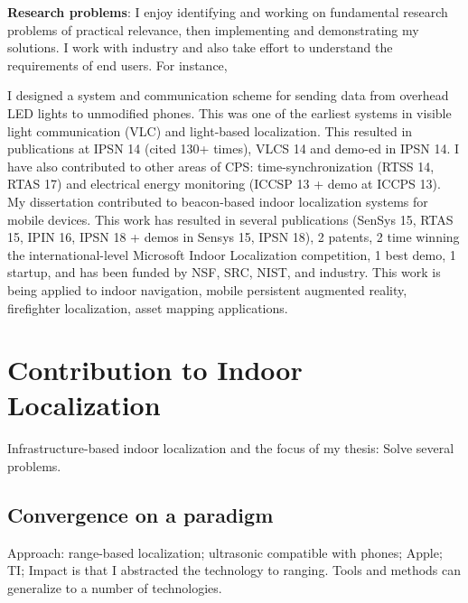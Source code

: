 \documentclass[10pt]{article}
\begin{document}
 \newpage

\textbf{Research problems}:
I enjoy identifying and working on fundamental research problems of practical relevance, then implementing and demonstrating my solutions. I work with industry and also take effort to understand the requirements of end users. For instance, 

I designed a system and communication scheme for sending data from overhead LED lights to unmodified phones. This was one of the earliest systems in visible light communication (VLC) and light-based localization. This resulted in publications at IPSN 14 (cited 130+ times), VLCS 14 and demo-ed in IPSN 14. %
I have also contributed to other areas of CPS: time-synchronization (RTSS 14, RTAS 17) and electrical energy monitoring (ICCSP 13 + demo at ICCPS 13). My dissertation contributed to beacon-based indoor localization systems for mobile devices. This work has resulted in several publications (SenSys 15, RTAS 15, IPIN 16, IPSN 18 + demos in Sensys 15, IPSN 18), 2 patents, 2 time winning the international-level Microsoft Indoor Localization competition, 1 best demo, 1 startup, and has been funded by NSF, SRC, NIST, and industry. This work is being applied to indoor navigation, mobile persistent augmented reality, firefighter localization, asset mapping applications. 

\section{Contribution to Indoor Localization}
Infrastructure-based indoor localization and the focus of my thesis:
Solve several problems.

\subsection{ Convergence on a paradigm }
Approach: range-based localization; ultrasonic compatible with phones; Apple; TI; 
Impact is that I abstracted the technology to ranging. Tools and methods can generalize to a number of technologies.
\end{document}
